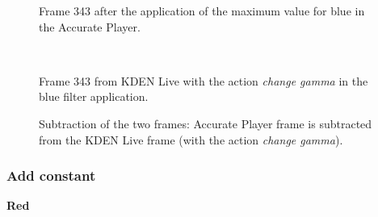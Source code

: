 \documentclass[../MasterThesis.tex]{subfiles}
\begin{document}
\begin{minipage}{0.48\textwidth}
	\begin{figure}[H]
		\begin{center}
			\caption[]{\small Frame 343 after the application of the maximum value for blue in the Accurate Player.}
		\end{center}
	\end{figure}
\end{minipage}\begin{minipage}{0.04\textwidth}
	\ 
\end{minipage}\begin{minipage}{0.48\textwidth}
	\begin{figure}[H]
		\begin{center}
			\caption[]{\small Frame 343 from KDEN Live with the action \textit{change gamma} in the blue filter application.}
		\end{center}
	\end{figure}
\end{minipage}

\vspace*{-1em}

\begin{figure}[H]
	\begin{center}
		\caption[]{\small Subtraction of the two frames: Accurate Player frame is subtracted from the KDEN Live frame (with the action \textit{change gamma}).}
	\end{center}
\end{figure}















\subsubsection*{Add constant}




\textbf{Red}

\vspace*{-1em}
\end{document}
